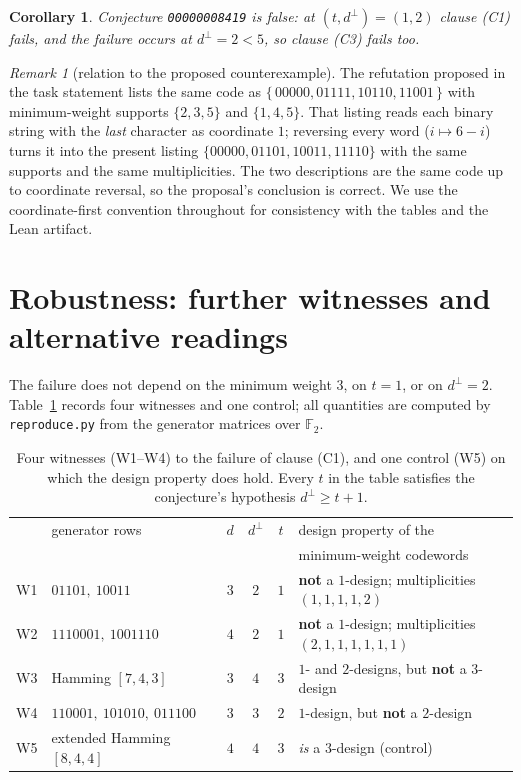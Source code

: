 \documentclass[11pt]{article}
\newtheorem{corollary}[theorem]{Corollary}
\theoremstyle{definition}
\theoremstyle{remark}
\newtheorem{remark}[theorem]{Remark}
\newcommand{\F}{\mathbb{F}}
\newcommand{\dperp}{d^{\perp}}
\begin{document}
\begin{corollary}
Conjecture \texttt{00000008419} is false: at $(t, \dperp) = (1,2)$ clause (C1)
fails, and the failure occurs at $\dperp = 2 < 5$, so clause (C3) fails too.
\end{corollary}

\begin{remark}[relation to the proposed counterexample]
The refutation proposed in the task statement lists the same code as
$\{\,00000, 01111, 10110, 11001\,\}$ with minimum-weight supports
$\{2,3,5\}$ and $\{1,4,5\}$. That listing reads each binary string with the
\emph{last} character as coordinate $1$; reversing every word
($i \mapsto 6-i$) turns it into the present listing
$\{00000, 01101, 10011, 11110\}$ with the same supports and the same
multiplicities. The two descriptions are the same code up to coordinate
reversal, so the proposal's conclusion is correct. We use the coordinate-first
convention throughout for consistency with the tables and the Lean artifact.
\end{remark}

\section{Robustness: further witnesses and alternative readings}
\label{sec:robust}

The failure does not depend on the minimum weight $3$, on $t = 1$, or on
$\dperp = 2$. Table~\ref{tab:witnesses} records four witnesses and one control;
all quantities are computed by \texttt{reproduce.py} from the generator
matrices over $\F_2$.

\begin{table}[h]
\centering
\small
\begin{tabular}{l l c c c l}
\toprule
& generator rows & $d$ & $\dperp$ & $t$ & design property of the \\
& & & & & minimum-weight codewords \\
\midrule
W1 & $01101,\ 10011$ & $3$ & $2$ & $1$ & \textbf{not} a $1$-design; multiplicities $(1,1,1,1,2)$ \\
W2 & $1110001,\ 1001110$ & $4$ & $2$ & $1$ & \textbf{not} a $1$-design; multiplicities $(2,1,1,1,1,1,1)$ \\
W3 & Hamming $[7,4,3]$ & $3$ & $4$ & $3$ & $1$- and $2$-designs, but \textbf{not} a $3$-design \\
W4 & $110001,\ 101010,\ 011100$ & $3$ & $3$ & $2$ & $1$-design, but \textbf{not} a $2$-design \\
\midrule
W5 & extended Hamming $[8,4,4]$ & $4$ & $4$ & $3$ & \emph{is} a $3$-design (control) \\
\bottomrule
\end{tabular}
\caption{Four witnesses (W1--W4) to the failure of clause (C1), and one control
(W5) on which the design property does hold. Every $t$ in the table satisfies
the conjecture's hypothesis $\dperp \ge t+1$.}
\label{tab:witnesses}
\end{table}
\end{document}
